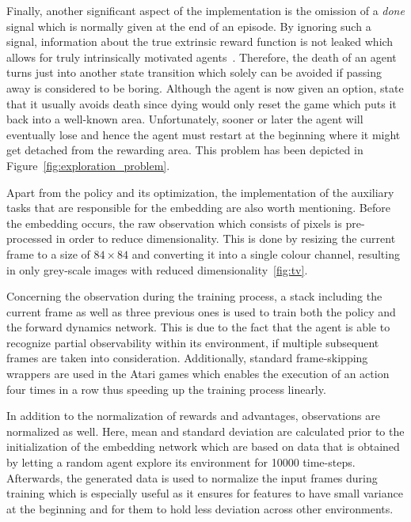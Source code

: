 \documentclass[draft,final]{vutinfth} %
\begin{document}
    Finally, another significant aspect of the implementation is the omission of a \textit{done} signal which is normally given at the end of an episode.
    By ignoring such a signal, information about the true extrinsic reward function is not leaked which allows for truly intrinsically motivated agents~\citep{burda_large-scale_2018-1}.
    Therefore, the death of an agent turns just into another state transition which solely can be avoided if passing away is considered to be boring.
    Although the agent is now given an option, \citet{burda_large-scale_2018-1} state that it usually avoids death since dying would only reset the game which puts it back into a well-known area.
    Unfortunately, sooner or later the agent will eventually lose and hence the agent must restart at the beginning where it might get detached from the rewarding area.
    This problem has been depicted in Figure~\ref{fig:exploration_problem}.

    Apart from the policy and its optimization, the implementation of the auxiliary tasks that are responsible for the embedding are also worth mentioning.
    Before the embedding occurs, the raw observation which consists of pixels is pre-processed in order to reduce dimensionality.
    This is done by resizing the current frame to a size of $84 \times 84$ and converting it into a single colour channel, resulting in only grey-scale images with reduced dimensionality~\eqref{fig:tv}.

    Concerning the observation during the training process, a stack including the current frame as well as three previous ones is used to train both the policy and the forward dynamics network.
    This is due to the fact that the agent is able to recognize partial observability within its environment, if multiple subsequent frames are taken into consideration.
    Additionally, standard frame-skipping wrappers are used in the Atari games which enables the execution of an action four times in a row thus speeding up the training process linearly.

    In addition to the normalization of rewards and advantages, observations are normalized as well.
    Here, mean and standard deviation are calculated prior to the initialization of the embedding network which are based on data that is obtained by letting a random agent explore its environment for 10000 time-steps.
    Afterwards, the generated data is used to normalize the input frames during training which is especially useful as it ensures for features to have small variance at the beginning and for them to hold less deviation across other environments.
\end{document}
